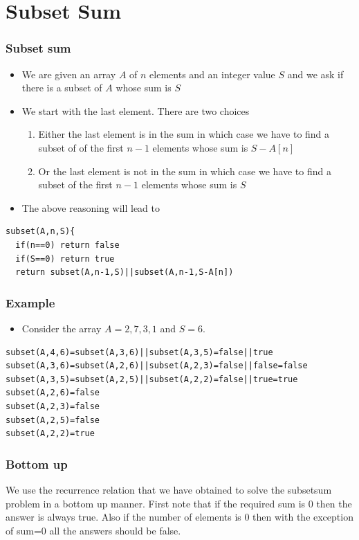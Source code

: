 \documentclass{beamer}
\begin{document}
\section{Subset Sum}
\begin{frame}[fragile]
  \frametitle{Subset sum}
  \begin{itemize}
  \item We are given an array $A$ of $n$ elements and an integer value $S$ and we ask if there is a subset of $A$ whose sum is $S$
  \item We start with the last element. There are two choices
    \begin{enumerate}
    \item Either the last element is in the sum in which case we have to find a subset of of the first $n-1$ elements whose sum is $S-A[n]$
    \item Or the last element is not in the sum in which case we have to find a subset of the first $n-1$ elements whose sum is $S$
    \end{enumerate}
\item The above reasoning will lead to 
  \end{itemize}
\begin{lstlisting}[numbers=none]
subset(A,n,S){
  if(n==0) return false
  if(S==0) return true
  return subset(A,n-1,S)||subset(A,n-1,S-A[n])
\end{lstlisting}
\end{frame}
\begin{frame}[fragile]
  \frametitle{Example}
  \begin{itemize}
  \item Consider the array $A={2,7,3,1}$ and $S=6$.
  \end{itemize}
\begin{verbatim}
subset(A,4,6)=subset(A,3,6)||subset(A,3,5)=false||true
subset(A,3,6)=subset(A,2,6)||subset(A,2,3)=false||false=false
subset(A,3,5)=subset(A,2,5)||subset(A,2,2)=false||true=true
subset(A,2,6)=false
subset(A,2,3)=false
subset(A,2,5)=false
subset(A,2,2)=true
\end{verbatim}
\end{frame}
\begin{frame}
  \frametitle{Bottom up}
  We use the recurrence relation that we have obtained to solve the subsetsum problem in a bottom
  up manner. First note that if the required sum is 0 then the answer is always true. Also if the number
  of elements is 0 then with the exception of sum=0 all the answers should be false.
  
\end{frame}
\begin{frame}
  
\begin{algorithm}[H]
  \DontPrintSemicolon
 \BlankLine
{}
\end{algorithm}
\end{frame}
\end{document}

